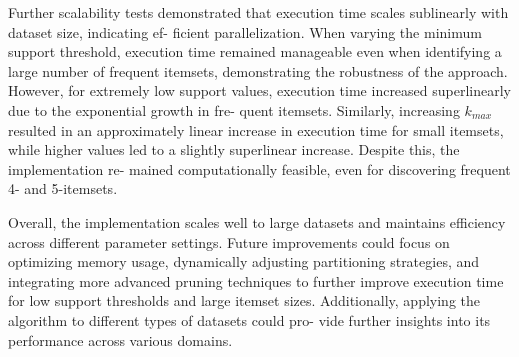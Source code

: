 \documentclass{Class/julia}
\begin{document}
Further scalability tests demonstrated that execution time scales sublinearly with dataset size, indicating ef- ficient parallelization. When varying the minimum support threshold, execution time remained manageable even when identifying a large number of frequent itemsets, demonstrating the robustness of the approach. However, for extremely low support values, execution time increased superlinearly due to the exponential growth in fre- quent itemsets. Similarly, increasing \( k_{max} \) resulted in an approximately linear increase in execution time for small itemsets, while higher values led to a slightly superlinear increase. Despite this, the implementation re- mained computationally feasible, even for discovering frequent 4- and 5-itemsets.

Overall, the implementation scales well to large datasets and maintains efficiency across different parameter settings. Future improvements could focus on optimizing memory usage, dynamically adjusting partitioning strategies, and integrating more advanced pruning techniques to further improve execution time for low support thresholds and large itemset sizes. Additionally, applying the algorithm to different types of datasets could pro- vide further insights into its performance across various domains.

\end{document}
